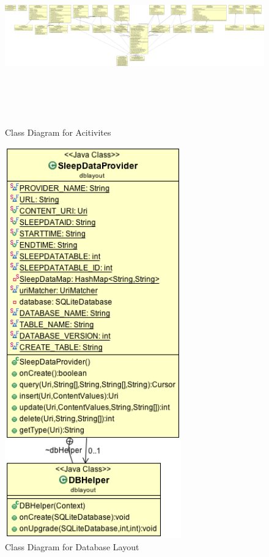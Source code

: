 \documentclass[14pt]{extreport}
\begin{document}
\begin{figure}[h]
\begin{center}
\includegraphics[width=6in,height=3in]{ClassDiagramForAcitivites}
\end{center}
\caption[Class Diagram for Acitivites]{Class Diagram for Acitivites}
\end{figure}

\begin{figure}[h]
\begin{center}
\includegraphics[width=3in]{ClassDiagramForDB}
\end{center}
\caption[Class Diagram for Database Layout]{Class Diagram for Database Layout}
\end{figure}
\end{document}
